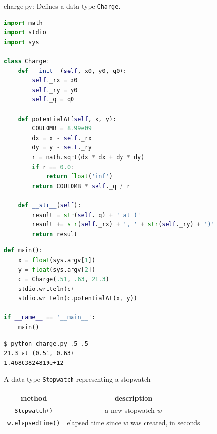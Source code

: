 \documentclass[8pt,a4paper,compress,handout]{beamer}
\begin{document}
\begin{frame}[fragile]
\begin{framed}
\tiny charge.py: Defines a data type \lstinline{Charge}. 
\end{framed}

\begin{lstlisting}[language=Python]
import math
import stdio
import sys

class Charge:
    def __init__(self, x0, y0, q0):
        self._rx = x0
        self._ry = y0
        self._q = q0

    def potentialAt(self, x, y):
        COULOMB = 8.99e09
        dx = x - self._rx
        dy = y - self._ry
        r = math.sqrt(dx * dx + dy * dy)
        if r == 0.0:
            return float('inf')
        return COULOMB * self._q / r

    def __str__(self):
        result = str(self._q) + ' at ('
        result += str(self._rx) + ', ' + str(self._ry) + ')'
        return result
\end{lstlisting}
\end{frame}

\begin{frame}[fragile]
\begin{lstlisting}[language=Python]
def main():
    x = float(sys.argv[1])
    y = float(sys.argv[2])
    c = Charge(.51, .63, 21.3)
    stdio.writeln(c)
    stdio.writeln(c.potentialAt(x, y))

if __name__ == '__main__':
    main()
\end{lstlisting}

\begin{lstlisting}[language={}]
$ python charge.py .5 .5
21.3 at (0.51, 0.63)
1.46863824819e+12
\end{lstlisting}
\end{frame}

\begin{frame}[fragile]
A data type \lstinline{Stopwatch} representing a stopwatch
\begin{center}
\begin{tabular}{cc}
method & description \\ \hline
\lstinline$Stopwatch()$ & a new stopwatch $w$ \\
\lstinline$w.elapsedTime()$ & elapsed time since $w$ was created, in seconds
\end{tabular} 
\end{center}
\end{frame}
\end{document}
